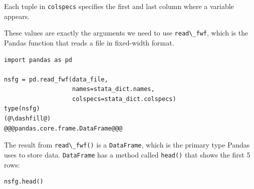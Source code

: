 Each tuple in \passthrough{\lstinline!colspecs!} specifies the first and
last column where a variable appears.

These values are exactly the arguments we need to use
\passthrough{\lstinline!read\_fwf!}, which is the Pandas function that
reads a file in fixed-width format.

\begin{lstlisting}[]
import pandas as pd

nsfg = pd.read_fwf(data_file, 
                   names=stata_dict.names, 
                   colspecs=stata_dict.colspecs)
type(nsfg)
(@\dashfill@)
@@@pandas.core.frame.DataFrame@@@
\end{lstlisting}

The result from \passthrough{\lstinline!read\_fwf()!} is a
\passthrough{\lstinline!DataFrame!}, which is the primary type Pandas
uses to store data. \passthrough{\lstinline!DataFrame!} has a method
called \passthrough{\lstinline!head()!} that shows the first 5 rows:

\begin{lstlisting}[]
nsfg.head()
\end{lstlisting}

